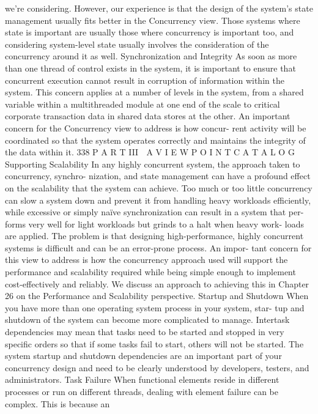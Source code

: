 we’re considering. However, our experience is that the design of the system’s
state management usually fits better in the Concurrency view. Those systems
where state is important are usually those where concurrency is important
too, and considering system-level state usually involves the consideration of
the concurrency around it as well.
Synchronization and Integrity
As soon as more than one thread of control exists in the system, it is important
to ensure that concurrent execution cannot result in corruption of information
within the system. This concern applies at a number of levels in the system,
from a shared variable within a multithreaded module at one end of the scale to
critical corporate transaction data in shared data stores at the other.
An important concern for the Concurrency view to address is how concur-
rent activity will be coordinated so that the system operates correctly and
maintains the integrity of the data within it.
338
 P A R T III  A V I E W P O I N T C A T A L O G
Supporting Scalability
In any highly concurrent system, the approach taken to concurrency, synchro-
nization, and state management can have a profound effect on the scalability
that the system can achieve. Too much or too little concurrency can slow a
system down and prevent it from handling heavy workloads efficiently, while
excessive or simply naïve synchronization can result in a system that per-
forms very well for light workloads but grinds to a halt when heavy work-
loads are applied. The problem is that designing high-performance, highly
concurrent systems is difficult and can be an error-prone process. An impor-
tant concern for this view to address is how the concurrency approach used
will support the performance and scalability required while being simple
enough to implement cost-effectively and reliably. We discuss an approach to
achieving this in Chapter 26 on the Performance and Scalability perspective.
Startup and Shutdown
When you have more than one operating system process in your system, star-
tup and shutdown of the system can become more complicated to manage.
Intertask dependencies may mean that tasks need to be started and stopped in
very specific orders so that if some tasks fail to start, others will not be
started. The system startup and shutdown dependencies are an important part
of your concurrency design and need to be clearly understood by developers,
testers, and administrators.
Task Failure
When functional elements reside in different processes or run on different
threads, dealing with element failure can be complex. This is because an
